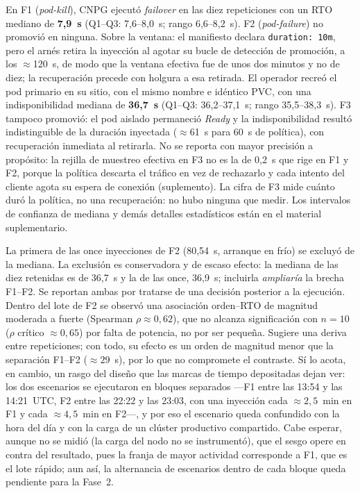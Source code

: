 \documentclass[12pt,twocolumn,letterpaper]{article}
\begin{document}
En F1 (\textit{pod-kill}), CNPG ejecutó \textit{failover} en las diez repeticiones con un RTO mediano de \textbf{7,9~s} (Q1--Q3: 7,6--8,0~s; rango 6,6--8,2~s). F2 (\textit{pod-failure}) no promovió en ninguna. Sobre la ventana: el manifiesto declara \texttt{duration:\ 10m}, pero el arnés retira la inyección al agotar su bucle de detección de promoción, a los $\approx$120~s, de modo que la ventana efectiva fue de unos dos minutos y no de diez; la recuperación precede con holgura a esa retirada. El operador recreó el pod primario en su sitio, con el mismo nombre e idéntico PVC, con una indisponibilidad mediana de \textbf{36,7~s} (Q1--Q3: 36,2--37,1~s; rango 35,5--38,3~s). F3 tampoco promovió: el pod aislado permaneció \textit{Ready} y la indisponibilidad resultó indistinguible de la duración inyectada ($\approx$61~s para 60~s de política), con recuperación inmediata al retirarla. No se reporta con mayor precisión a propósito: la rejilla de muestreo efectiva en F3 no es la de 0,2~s que rige en F1 y F2, porque la política descarta el tráfico en vez de rechazarlo y cada intento del cliente agota su espera de conexión (suplemento). La cifra de F3 mide cuánto duró la política, no una recuperación: no hubo ninguna que medir. Los intervalos de confianza de mediana y demás detalles estadísticos están en el material suplementario.

La primera de las once inyecciones de F2 (80,54~s, arranque en frío) se excluyó de la mediana. La exclusión es conservadora y de escaso efecto: la mediana de las diez retenidas es de 36,7~s y la de las once, 36,9~s; incluirla \emph{ampliaría} la brecha F1--F2. Se reportan ambas por tratarse de una decisión posterior a la ejecución. Dentro del lote de F2 se observó una asociación orden--RTO de magnitud moderada a fuerte (Spearman $\rho\approx 0{,}62$), que no alcanza significación con $n=10$ ($\rho$ crítico $\approx 0{,}65$) por falta de potencia, no por ser pequeña. Sugiere una deriva entre repeticiones; con todo, su efecto es un orden de magnitud menor que la separación F1--F2 ($\approx 29$~s), por lo que no compromete el contraste. Sí lo acota, en cambio, un rasgo del diseño que las marcas de tiempo depositadas dejan ver: los dos escenarios se ejecutaron en bloques separados —F1 entre las 13:54 y las 14:21~UTC, F2 entre las 22:22 y las 23:03, con una inyección cada $\approx 2{,}5$~min en F1 y cada $\approx 4{,}5$~min en F2—, y por eso el escenario queda confundido con la hora del día y con la carga de un clúster productivo compartido. Cabe esperar, aunque no se midió  (la carga del nodo no se instrumentó), que el sesgo opere en contra del resultado, pues la franja de mayor actividad corresponde a F1, que es el lote rápido; aun así, la alternancia de escenarios dentro de cada bloque queda pendiente para la Fase~2.
\end{document}

